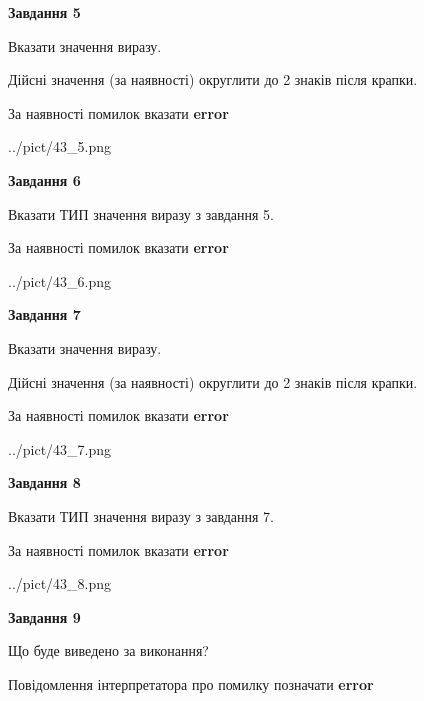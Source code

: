 \documentclass[11pt, ukrainian]{article}
\begin{document}
{\begin {large}
{\begin {center}\textbf{Завдання 5}\end {center}}\par
Вказати значення виразу. \par
Дійсні значення (за наявності) округлити до 2 знаків після крапки. \par
За наявності помилок вказати \textbf{error}

\begin{center}
	{../pict/43_5.png}
\end{center}
\newpage

{\begin {center}\textbf{Завдання 6}\end {center}}\par
Вказати ТИП значення виразу з завдання 5. \par
За наявності помилок вказати \textbf{error}

\begin{center}
	{../pict/43_6.png}
\end{center}
\newpage

{\begin {center}\textbf{Завдання 7}\end {center}}\par
Вказати значення виразу. \par
Дійсні значення (за наявності) округлити до 2 знаків після крапки. \par
За наявності помилок вказати \textbf{error}

\begin{center}
	{../pict/43_7.png}
\end{center}
\newpage

{\begin {center}\textbf{Завдання 8}\end {center}}\par
Вказати ТИП значення виразу з завдання 7. \par
За наявності помилок вказати \textbf{error}

\begin{center}
	{../pict/43_8.png}
\end{center}
\newpage

{\begin {center}\textbf{Завдання 9}\end {center}}\par
Що буде виведено за виконання? \par
Повідомлення інтерпретатора про помилку позначати \textbf{error}


\end{large}}
\end{document}
